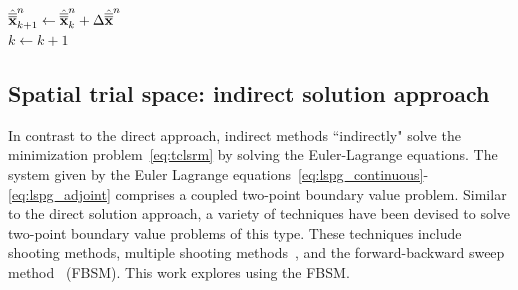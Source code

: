 \begin{algorithm}
{$\hat{\overline{\overline{\mathbf {x}}}}^{n}_{k+1} \leftarrow \hat{\overline{\overline{\mathbf {x}}}}^{n}_k + \Delta \hat{\overline{\overline{\mathbf {x}}}}^{n}$  \\
$k\leftarrow k+1$
}
\end{algorithm}


%

\subsection{Spatial trial space: indirect solution approach}\label{sec:indirect}
In contrast to the direct approach,
indirect methods ``indirectly" solve the minimization
problem~\eqref{eq:tclsrm} by solving the Euler-Lagrange equations. The
system given by the Euler Lagrange equations~\eqref{eq:lspg_continuous}-\eqref{eq:lspg_adjoint} comprises a coupled two-point boundary value
problem. Similar to the direct solution approach, a variety of techniques have
been devised to solve two-point boundary value problems of this type. These
techniques include shooting methods, multiple shooting
methods~\cite{multiple_shooting}, and the forward-backward sweep
method~\cite{fbs} (FBSM).  This work explores using the FBSM. 


